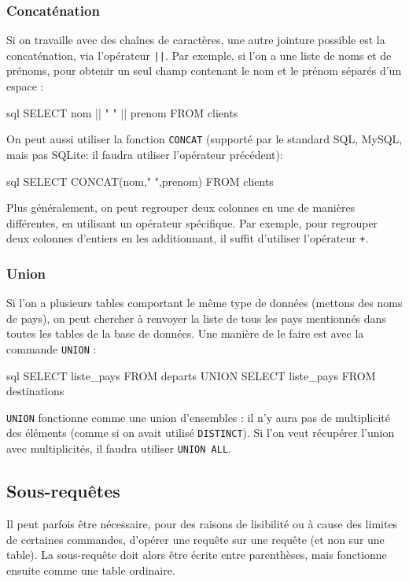 \documentclass[a4paper]{scrartcl}
\begin{document}
			\subsubsection{Concaténation}
				\semidef Si on travaille avec des chaînes de caractères, une autre jointure possible est la concaténation, via l'opérateur \texttt{||}.
				Par exemple, si l'on a une liste de noms et de prénoms, pour obtenir un seul champ contenant le nom et le prénom séparés d'un espace :
				\begin{code}{sql}
					SELECT nom || " " || prenom
					FROM clients
				\end{code}

				\rem On peut aussi utiliser la fonction \texttt{CONCAT} (supporté par le standard SQL, MySQL, mais pas SQLite: il faudra utiliser l'opérateur précédent):
				\begin{code}{sql}
					SELECT CONCAT(nom," ",prenom)
					FROM clients
				\end{code}

				\rem Plus généralement, on peut regrouper deux colonnes en une de manières différentes, en utilisant un opérateur spécifique.
				Par exemple, pour regrouper deux colonnes d'entiers en les additionnant, il suffit d'utiliser l'opérateur \texttt{+}.

			\subsubsection{Union}
				Si l'on a plusieurs tables comportant le même type de données (mettons des noms de pays), on peut chercher à renvoyer la liste de tous les pays mentionnés dans toutes les tables de la base de données. Une manière de le faire est avec la commande \texttt{UNION} : 
				\begin{code}{sql}
					SELECT liste_pays FROM departs
					UNION
					SELECT liste_pays FROM destinations
				\end{code}

				\rem \texttt{UNION} fonctionne comme une union d'ensembles : il n'y aura pas de multiplicité des éléments (comme si on avait utilisé \texttt{DISTINCT}).
					Si l'on veut récupérer l'union avec multiplicités, il faudra utiliser \texttt{UNION ALL}. 
		
		\subsection{Sous-requêtes}
			Il peut parfois être nécessaire, pour des raisons de lisibilité ou à cause des limites de certaines commandes, 
			d'opérer une requête sur une requête (et non sur une table). La sous-requête doit alors être écrite entre parenthèses,
			mais fonctionne ensuite comme une table ordinaire.
			
\end{document}
